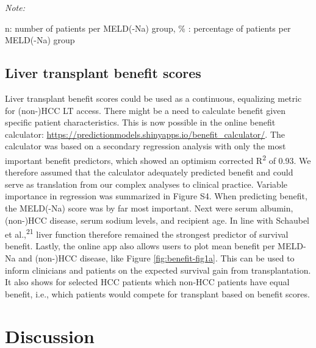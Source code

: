 \documentclass[11pt,english,]{book} %
\begin{document}
\begin{table}
{\begin{threeparttable}
\begin{tabular}[t]{lrllrllrll}
\bottomrule
\end{tabular}
\begin{tablenotes}
\item \textit{Note: } 
\item n: number of patients per MELD(-Na) group, \% : percentage of patients per MELD(-Na) group
\end{tablenotes}
\end{threeparttable}}
\end{table}

\linespread{1.213}

\hypertarget{liver-transplant-benefit-scores}{%
\subsection*{Liver transplant benefit scores}\label{liver-transplant-benefit-scores}}

Liver transplant benefit scores could be used as a continuous, equalizing metric for (non-)HCC LT access. There might be a need to calculate benefit given specific patient characteristics. This is now possible in the online benefit calculator: \url{https://predictionmodels.shinyapps.io/benefit_calculator/}. The calculator was based on a secondary regression analysis with only the most important benefit predictors, which showed an optimism corrected R\textsuperscript{2} of 0.93. We therefore assumed that the calculator adequately predicted benefit and could serve as translation from our complex analyses to clinical practice. Variable importance in regression was summarized in Figure S4. When predicting benefit, the MELD(-Na) score was by far most important. Next were serum albumin, (non-)HCC disease, serum sodium levels, and recipient age. In line with Schaubel et al.,\textsuperscript{21} liver function therefore remained the strongest predictor of survival benefit.
Lastly, the online app also allows users to plot mean benefit per MELD-Na and (non-)HCC disease, like Figure \ref{fig:benefit-fig1a}. This can be used to inform clinicians and patients on the expected survival gain from transplantation. It also shows for selected HCC patients which non-HCC patients have equal benefit, i.e., which patients would compete for transplant based on benefit scores.

\hypertarget{discussion-4}{%
\section*{Discussion}\label{discussion-4}}
\end{document}
